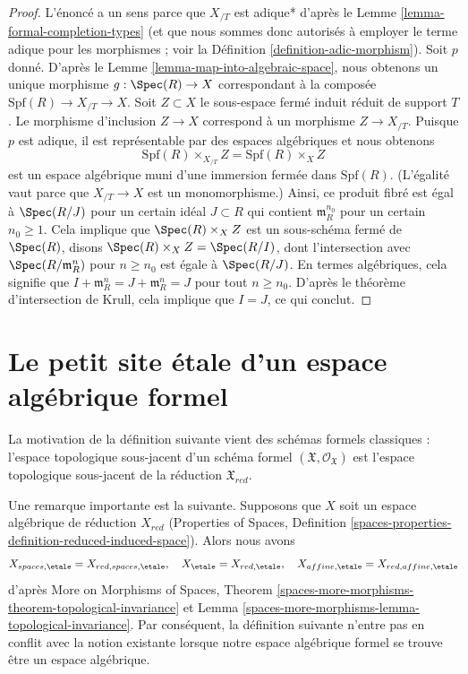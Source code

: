 \begin{proof}
L'énoncé a un sens parce que $X_{/T}$ est adique* d'après le
Lemme \ref{lemma-formal-completion-types} (et que nous sommes donc
autorisés à employer le terme adique pour les morphismes ; voir la
Définition \ref{definition-adic-morphism}).
Soit $p$ donné. D'après le Lemme \ref{lemma-map-into-algebraic-space},
nous obtenons un unique morphisme $g : \Spec(R) \to X$ correspondant à
la composée $\text{Spf}(R) \to X_{/T} \to X$.
Soit $Z \subset X$ le sous-espace fermé induit réduit de support
$T$. Le morphisme d'inclusion $Z \to X$ correspond à un morphisme
$Z \to X_{/T}$. Puisque $p$ est adique, il est représentable par des espaces
algébriques et nous obtenons
$$
\text{Spf}(R) \times_{X_{/T}} Z = \text{Spf}(R) \times_X Z
$$
est un espace algébrique muni d'une immersion fermée dans $\text{Spf}(R)$.
(L'égalité vaut parce que $X_{/T} \to X$ est un monomorphisme.)
Ainsi, ce produit fibré est égal à $\Spec(R/J)$ pour un certain
idéal $J \subset R$ qui contient $\mathfrak m_R^{n_0}$ pour un certain
$n_0 \geq 1$. Cela implique que $\Spec(R) \times_X Z$
est un sous-schéma fermé de $\Spec(R)$,
disons $\Spec(R) \times_X Z = \Spec(R/I)$, dont l'intersection avec
$\Spec(R/\mathfrak m_R^n)$ pour $n \geq n_0$ est égale à $\Spec(R/J)$.
En termes algébriques, cela signifie que
$I + \mathfrak m_R^n = J + \mathfrak m_R^n = J$ pour tout $n \geq n_0$.
D'après le théorème d'intersection de Krull,
cela implique que $I = J$, ce qui conclut.
\end{proof}








\section{Le petit site \'etale d'un espace algébrique formel}
\label{section-etale-sites}

\noindent
La motivation de la définition suivante vient des schémas
formels classiques : l'espace topologique sous-jacent d'un schéma formel
$(\mathfrak X, \mathcal{O}_\mathfrak X)$
est l'espace topologique sous-jacent de la réduction $\mathfrak X_{red}$.

\medskip\noindent
Une remarque importante est la suivante. Supposons que $X$ soit un espace algébrique
de réduction $X_{red}$ (Properties of Spaces, Definition
\ref{spaces-properties-definition-reduced-induced-space}).
Alors nous avons
$$
X_{spaces, \etale} = X_{red, spaces, \etale},\quad
X_\etale = X_{red, \etale},\quad
X_{affine, \etale} = X_{red, affine, \etale}
$$
d'après More on Morphisms of Spaces, Theorem
\ref{spaces-more-morphisms-theorem-topological-invariance} et
Lemma \ref{spaces-more-morphisms-lemma-topological-invariance}.
Par conséquent, la définition suivante n'entre pas en conflit avec la notion
existante lorsque notre espace algébrique formel se trouve être
un espace algébrique.

